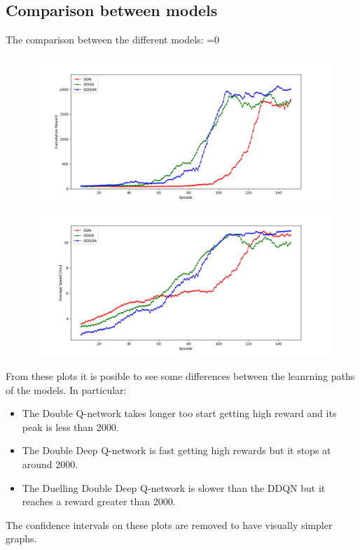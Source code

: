 \documentclass[14pt]{extarticle}
\def\sp{\vspace{5pt}}
\newcounter{debug}
\begin{document}
\begin{flushleft}
\subsection{Comparison between models}
\sp
The comparison between the different models:
\ifnum\value{debug}=0 {
	\begin{figure}[H]
    		\centering\includegraphics[width=1\textwidth]{./Image/Results/Comparison/rewards.png}
    		\vspace{-5mm}
    		\centering\includegraphics[width=1\textwidth]{./Image/Results/Comparison/speeds.png}
	\end{figure}
	}\fi
	From these plots it is posible to see some differences between the leanrning paths of the models. In particular:
	\begin{itemize}
	\item The Double Q-network takes longer too start getting high reward and its peak is less than 2000.
	\item The Double Deep Q-network is fast getting high rewards but it stops at around 2000.
	\item The Duelling Double Deep Q-network is slower than the DDQN but it reaches a reward greater than 2000.
	\end{itemize}
	The confidence intervals on these plots are removed to have visually simpler graphs.
	

\end{flushleft}
\end{document}
